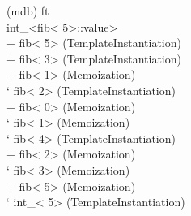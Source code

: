 
\begin{tttenv}
(mdb) ft \\
int\_<fib<{\color{color04} 5}>::value> \\
{\color{color03} + }fib<{\color{color04} 5}> (TemplateInstantiation) \\
{\color{color03} \textbar{} }{\color{color06} + }fib<{\color{color04} 3}>
(TemplateInstantiation) \\
{\color{color03} \textbar{} }{\color{color06} \textbar{} }{\color{color07} + }fib<{\color{color04} 1}>
(Memoization) \\
{\color{color03} \textbar{} }{\color{color06} \textbar{} }{\color{color07} ` }fib<{\color{color04} 2}>
(TemplateInstantiation) \\
{\color{color03} \textbar{} }{\color{color06} \textbar{} }{\color{color07} \hspace{0.5em} }{\color{color08} +
}fib<{\color{color04} 0}> (Memoization) \\
{\color{color03} \textbar{} }{\color{color06} \textbar{} }{\color{color07} \hspace{0.5em} }{\color{color08} `
}fib<{\color{color04} 1}> (Memoization) \\
{\color{color03} \textbar{} }{\color{color06} ` }fib<{\color{color04} 4}>
(TemplateInstantiation) \\
{\color{color03} \textbar{} }{\color{color06} \hspace{0.5em} }{\color{color07} + }fib<{\color{color04} 2}>
(Memoization) \\
{\color{color03} \textbar{} }{\color{color06} \hspace{0.5em} }{\color{color07} ` }fib<{\color{color04} 3}>
(Memoization) \\
{\color{color03} + }fib<{\color{color04} 5}> (Memoization) \\
{\color{color03} ` }int\_<{\color{color04} 5}> (TemplateInstantiation) \\
\end{tttenv}
